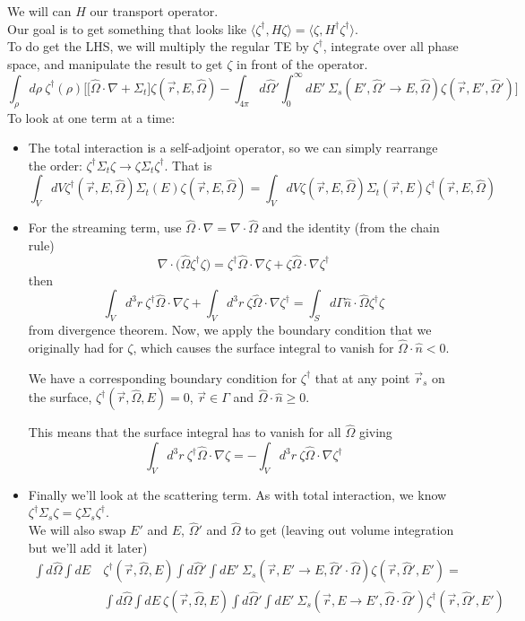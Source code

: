 \documentclass[12pt]{article}
\newcommand{\rvec}{\ensuremath{\vec{r}}}
\newcommand{\vOmega}{\ensuremath{\hat{\Omega}}}
\begin{document}
We will can $H$ our transport operator.\\
Our goal is to get something that looks like $\langle\zeta^{\dagger}, H \zeta\rangle = \langle\zeta, H^{\dagger} \zeta^{\dagger}\rangle$.\\


To do get the LHS, we will multiply the regular TE by $\zeta^{\dagger}$, integrate over all phase space, and manipulate the result to get $\zeta$ in front of the operator.
%
\[\int_{\rho} d\rho\: \zeta^{\dagger}(\rho)\biggl[ \bigl[\vOmega \cdot \nabla + \Sigma_t\bigr] \zeta(\vec{r}, E, \vOmega) - \int_{4 \pi} d\vOmega' \int_0^{\infty} dE' \: \Sigma_s(E', \vOmega' \rightarrow E, \vOmega) \zeta(\vec{r}, E', \vOmega') \biggr]\]
% 
To look at one term at a time:
\begin{itemize}
\item The total interaction is a self-adjoint operator, so we can simply rearrange the order: $\zeta^{\dagger} \Sigma_t \zeta \rightarrow \zeta \Sigma_t \zeta^{\dagger}$. That is
\[\int_V dV \zeta^{\dagger}(\vec{r}, E, \vOmega) \Sigma_t(E) \zeta(\vec{r}, E, \vOmega) = \int_V dV \zeta(\vec{r}, E, \vOmega) \Sigma_t(\rvec,E) \zeta^{\dagger}(\vec{r}, E, \vOmega)\]
%
\item For the streaming term, use $\vOmega \cdot \nabla = \nabla \cdot \vOmega$ and the identity (from the chain rule)
\[\nabla \cdot \bigl(\vOmega \zeta^{\dagger} \zeta \bigr) = \zeta^{\dagger}\vOmega \cdot \nabla \zeta + \zeta \vOmega \cdot \nabla \zeta^{\dagger}\]
then
\[
\int_V d^3r \:\zeta^{\dagger}\vOmega \cdot \nabla \zeta + \int_V d^3r \:\zeta \vOmega \cdot \nabla \zeta^{\dagger} = \int_S d \Gamma \hat{n} \cdot \vOmega \zeta^{\dagger} \zeta
\]
from divergence theorem. Now, we apply the boundary condition that we originally had for $\zeta$, which causes the surface integral to vanish for $\vOmega \cdot \hat{n} < 0$.

We have a corresponding boundary condition for $\zeta^{\dagger}$ that at any point $\rvec_s$ on the surface, $\zeta^{\dagger}(\rvec, \vOmega, E) = 0$, $\vec{r} \in \Gamma$ and $\vOmega \cdot \hat{n} \geq 0$.

This means that the surface integral has to vanish for all $\vOmega$ giving
\[
\int_V d^3r \:\zeta^{\dagger}\vOmega \cdot \nabla \zeta = -\int_V d^3r \:\zeta \vOmega \cdot \nabla \zeta^{\dagger}
\]
%
\item Finally we'll look at the scattering term. As with total interaction, we know $\zeta^{\dagger} \Sigma_s \zeta  = \zeta \Sigma_s \zeta^{\dagger}$. \\
We will also swap $E'$ and $E$, $\vOmega'$ and $\vOmega$ to get (leaving out volume integration but we'll add it later)
\begin{align*}
\int d\vOmega \int dE\: &\zeta^{\dagger}(\rvec, \vOmega, E) \int d\vOmega' \int dE'\: \Sigma_s(\rvec, E' \rightarrow E, \vOmega' \cdot \vOmega) \zeta(\rvec, \vOmega', E') = \\
%
&\int d\vOmega \int dE\: \zeta(\rvec, \vOmega, E) \int d\vOmega' \int dE'\: \Sigma_s(\rvec, E \rightarrow E', \vOmega \cdot \vOmega') \zeta^{\dagger}(\rvec, \vOmega', E') 
\end{align*}
\end{itemize}
\end{document}

